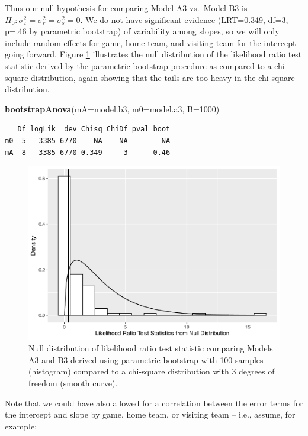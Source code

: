\documentclass[
]{krantz}
\newenvironment{Shaded}{\begin{snugshade}}{\end{snugshade}}
\newcommand{\DataTypeTok}[1]{\textcolor[rgb]{0.27,0.27,0.27}{#1}}
\newcommand{\DecValTok}[1]{\textcolor[rgb]{0.06,0.06,0.06}{#1}}
\newcommand{\KeywordTok}[1]{\textcolor[rgb]{0.27,0.27,0.27}{\textbf{#1}}}
\newcommand{\NormalTok}[1]{#1}
\begin{document}
Thus our null hypothesis for comparing Model A3 vs.~Model B3 is \(H_{0}: \sigma_{z}^{2}=\sigma_{r}^{2}=\sigma_{s}^{2}=0\). We do not have significant evidence (LRT=0.349, df=3, p=.46 by parametric bootstrap) of variability among slopes, so we will only include random effects for game, home team, and visiting team for the intercept going forward. Figure \ref{fig:gmu-lrt3} illustrates the null distribution of the likelihood ratio test statistic derived by the parametric bootstrap procedure as compared to a chi-square distribution, again showing that the tails are too heavy in the chi-square distribution.

\begin{Shaded}
\begin{Highlighting}[]
\KeywordTok{bootstrapAnova}\NormalTok{(}\DataTypeTok{mA=}\NormalTok{model.b3, }\DataTypeTok{m0=}\NormalTok{model.a3, }\DataTypeTok{B=}\DecValTok{1000}\NormalTok{)}
\end{Highlighting}
\end{Shaded}

\begin{verbatim}
   Df logLik  dev Chisq ChiDf pval_boot
m0  5  -3385 6770    NA    NA        NA
mA  8  -3385 6770 0.349     3      0.46
\end{verbatim}

\begin{figure}

{\centering \includegraphics[width=0.6\linewidth]{bookdown-BeyondMLR_files/figure-latex/gmu-lrt3-1} 

}

\caption{Null distribution of likelihood ratio test statistic comparing Models A3 and B3 derived using parametric bootstrap with 100 samples (histogram) compared to a chi-square distribution with 3 degrees of freedom (smooth curve).}\label{fig:gmu-lrt3}
\end{figure}

Note that we could have also allowed for a correlation between the error terms for the intercept and slope by game, home team, or visiting team -- i.e., assume, for example:
\end{document}

